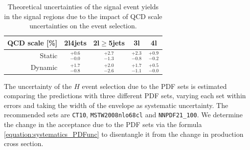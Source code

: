 \begin{table}
\caption{Theoretical uncertainties of the signal event yields in the signal regions due to the impact of QCD scale uncertainties on the event selection.}
\begin{center} 
\begin{tabular}{r|c|c|c|c|}
QCD scale [\%] & 2l4jets & 2l$\geq$5jets & 3l & 4l \\
\hline
Static   & $^{+0.6}_{-0.0}$ & $^{+2.7}_{-1.3}$ & $^{+2.3}_{-0.8}$ & $^{+0.9}_{-0.2}$ \\
Dynamic  & $^{+1.7}_{-0.8}$ & $^{+2.0}_{-2.6}$ & $^{+1.7}_{-1.1}$ & $^{+0.5}_{-0.0}$ \\
\hline
\end{tabular}
\end{center}
\label{table:systematics_theosystttH}
\end{table}%

The uncertainty of the \ttbar$H$ event selection due to the PDF sets is estimated comparing the predictions with three different PDF sets, varying each set within errors and taking the width of the envelope as systematic uncertainty. The recommended sets are \verb+CT10+, \verb+MSTW2008nlo68cl+ and \verb+NNPDF21_100+. 
We determine the change in the acceptance due to the PDF sets via the formula \ref{equation:systematics_PDFunc} to disentangle it from the change in production cross section.

